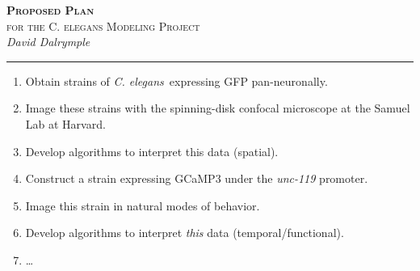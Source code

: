 \documentclass[letter,12pt]{article}
\newcommand{\cel}{{\em C. elegans}}
\newcommand{\checky}{ {\large \bfseries \CheckedBox } }
\newcommand{\notyet}{ {\large \Square} }
\begin{document}
\begin{center}
  \textsc{\Large \textbf{Proposed Plan} \\[0.5mm] for the C. elegans Modeling Project}\\[2.6mm]
	\textit{David Dalrymple}\\[1.7mm]
	\rule[2mm]{0.76\textwidth}{0.25mm}
\end{center}
\vspace{0.64cm}
\begin{enumerate}
  \item \checky Obtain strains of \cel\ expressing GFP pan-neuronally.
  \item \checky Image these strains with the spinning-disk confocal microscope at the Samuel Lab at Harvard.
  \item \notyet Develop algorithms to interpret this data (spatial).
  \item \notyet Construct a strain expressing GCaMP3 under the \textit{unc-119} promoter.
  \item \notyet Image this strain in natural modes of behavior.
  \item \notyet Develop algorithms to interpret \textit{this} data (temporal/functional).
  \item \ldots
\end{enumerate}
\end{document}
